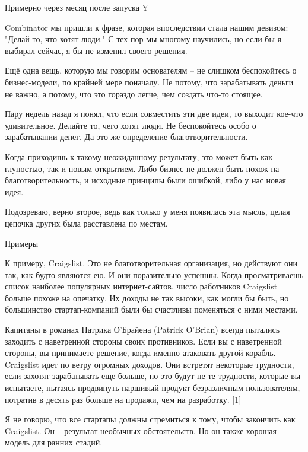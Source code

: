 \documentclass[ebook,12pt,oneside,openany]{memoir}
\begin{document}
\maketitle

Примерно через месяц после запуска Y

Combinator мы пришли к фразе, которая впоследствии стала нашим
девизом: "Делай то, что хотят люди." С тех пор мы многому научились,
но если бы я выбирал сейчас, я бы не изменил своего решения.

Ещё одна вещь, которую мы говорим основателям -- не слишком
беспокойтесь о бизнес-модели, по крайней мере поначалу. Не потому, что
зарабатывать деньги не важно, а потому, что это гораздо легче, чем
создать что-то стоящее.

Пару недель назад я понял, что если совместить эти две идеи, то
выходит кое-что удивительное. Делайте то, чего хотят люди. Не
беспокойтесь особо о зарабатывании денег. Да это же определение
благотворительности.

Когда приходишь к такому неожиданному результату, это может быть как
глупостью, так и новым открытием. Либо бизнес не должен быть похож на
благотворительность, и исходные принципы были ошибкой, либо у нас
новая идея.

Подозреваю, верно второе, ведь как только у меня появилась эта мысль,
целая цепочка других была расставлена по местам.

Примеры

К примеру, Craigslist. Это не благотворительная организация, но
действуют они так, как будто являются ею. И они поразительно успешны.
Когда просматриваешь список наиболее популярных интернет-сайтов, число
работников Craigslist больше похоже на опечатку. Их доходы не так
высоки, как могли бы быть, но большинство стартап-компаний были бы
счастливы поменяться с ними местами.

Капитаны в романах Патрика О'Брайена (Patrick O'Brian) всегда пытались
заходить с наветренной стороны своих противников. Если вы с
наветренной стороны, вы принимаете решение, когда именно атаковать
другой корабль. Craigslist идет по ветру огромных доходов. Они
встретят некоторые трудности, если захотят зарабатывать еще больше, но
это будут не те трудности, которые вы испытаете, пытаясь продвинуть
паршивый продукт безразличным пользователям, потратив в десять раз
больше на продажи, чем на разработку. [1]

Я не говорю, что все стартапы должны стремиться к тому, чтобы
закончить как Craigslist. Он -- результат необычных обстоятельств. Но
он также хорошая модель для ранних стадий.
\end{document}
